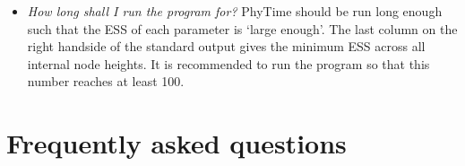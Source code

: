 \documentclass[a4paper,12pt]{article}
\newcommand{\x}[1]{\texttt{#1}}
\begin{document}
\begin{itemize}



\item {\em How  long shall I run the program  for?} PhyTime should be run long  enough such that the
ESS of  each parameter  is `large enough'.  The last column  on the  right handside of  the standard
output gives the minimum ESS across all internal  node heights. It is recommended to run the program
so that this number reaches at least 100.

\end{itemize}


\section{Frequently asked questions}
\end{document}

